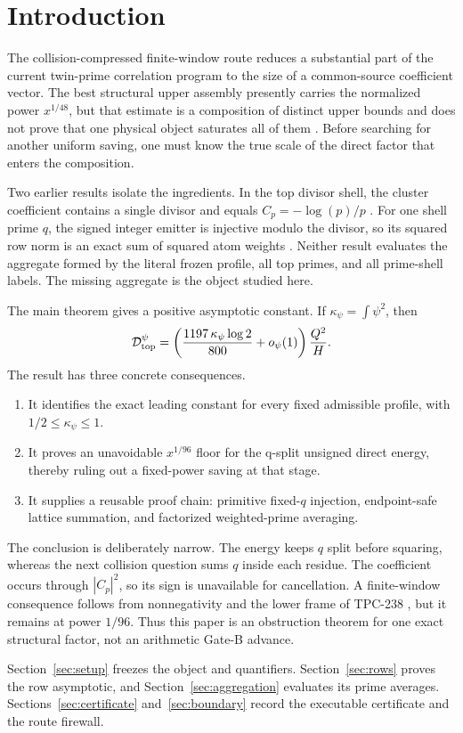 \section{Introduction}
\label{sec:introduction}

The collision-compressed finite-window route reduces a substantial part of the
current twin-prime correlation program to the size of a common-source
coefficient vector.  The best structural upper assembly presently carries the
normalized power $x^{1/48}$, but that estimate is a composition of distinct
upper bounds and does not prove that one physical object saturates all of them
\cite{WangTPC237}.  Before searching for another uniform saving, one must know
the true scale of the direct factor that enters the composition.

Two earlier results isolate the ingredients.  In the top divisor shell, the
cluster coefficient contains a single divisor and equals
$C_p=-\log(p)/p$ \cite{WangTPC215}.  For one shell prime $q$, the signed
integer emitter is injective modulo the divisor, so its squared row norm is an
exact sum of squared atom weights \cite{WangTPC216}.  Neither result evaluates
the aggregate formed by the literal frozen profile, all top primes, and all
prime-shell labels.  The missing aggregate is the object studied here.

The main theorem gives a positive asymptotic constant.  If
$\kappa_\psi=\int\psi^2$, then
\[
 \mathcal{D}_{\mathrm{top}}^{\psi}=\left(\frac{1197\,\kappa_\psi\log2}{800}
       +o_\psi(1)\right)\frac{Q^2}{H}.
\]
The result has three concrete consequences.

\begin{enumerate}[leftmargin=*,label=(\roman*)]
 \item It identifies the exact leading constant for every fixed admissible
 profile, with $1/2\leq\kappa_\psi\leq1$.
 \item It proves an unavoidable $x^{1/96}$ floor for the q-split unsigned
 direct energy, thereby ruling out a fixed-power saving at that stage.
 \item It supplies a reusable proof chain: primitive fixed-$q$ injection,
 endpoint-safe lattice summation, and factorized weighted-prime averaging.
\end{enumerate}

The conclusion is deliberately narrow.  The energy keeps $q$ split before
squaring, whereas the next collision question sums $q$ inside each residue.
The coefficient occurs through $|C_p|^2$, so its sign is unavailable for
cancellation.  A finite-window consequence follows from nonnegativity and the
lower frame of TPC-238 \cite{WangTPC238}, but it remains at power $1/96$.
Thus this paper is an obstruction theorem for one exact structural factor,
not an arithmetic Gate-B advance.

Section~\ref{sec:setup} freezes the object and quantifiers.
Section~\ref{sec:rows} proves the row asymptotic, and
Section~\ref{sec:aggregation} evaluates its prime averages.
Sections~\ref{sec:certificate} and~\ref{sec:boundary} record the executable
certificate and the route firewall.
